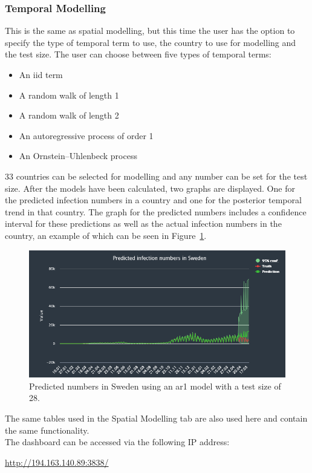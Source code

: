 \subsubsection*{Temporal Modelling}
This is the same as spatial modelling, but this time the user has the option to specify the type of temporal term to use, the country to use for modelling and the test size. The user can choose between five types of temporal terms:
\begin{itemize}
    \item[1.] An iid term
    \item[2.] A random walk of length 1
    \item[3.] A random walk of length 2
    \item[4.] An autoregressive process of order 1
    \item[5.] An Ornstein–Uhlenbeck process
\end{itemize}
33 countries can be selected for modelling and any number can be set for the test size. After the models have been calculated, two graphs are displayed. One for the predicted infection numbers in a country and one for the posterior temporal trend in that country. The graph for the predicted numbers includes a confidence interval for these predictions as well as the actual infection numbers in the country, an example of which can be seen in Figure~\ref{fig:sweden}.
\begin{figure}[H]
    \centering
    \includegraphics[width = \textwidth]{predicted_sweden.png}
    \caption{Predicted numbers in Sweden using an ar1 model with a test size of 28.}
    \label{fig:sweden}
\end{figure}
The same tables used in the Spatial Modelling tab are also used here and contain the same functionality. \\
The dashboard can be accessed via the following IP address:
\begin{center}
    \href{http://194.163.140.89:3838/}{http://194.163.140.89:3838/}
\end{center}